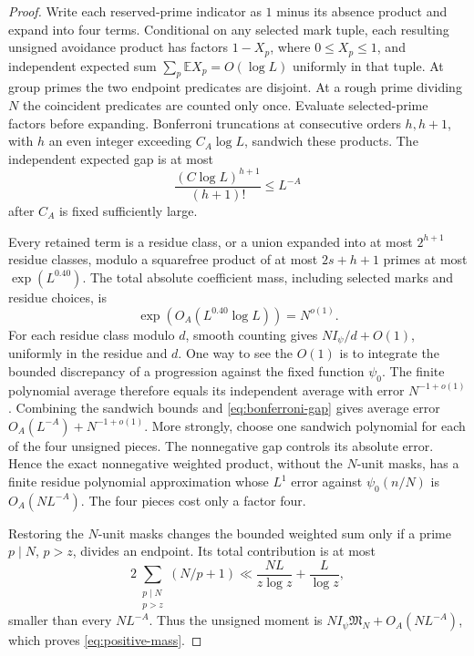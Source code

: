 \documentclass[11pt]{article}
\theoremstyle{definition}
\newcommand{\E}{\mathbb E}
\theoremstyle{remark}
\begin{document}
\begin{proof}
Write each reserved-prime indicator as $1$ minus its absence product
and expand into four terms. Conditional on any selected mark tuple,
each resulting unsigned avoidance product has factors $1-X_p$,
where $0\le X_p\le1$, and independent expected sum
$\sum_p\E X_p=O(\log L)$ uniformly in that tuple.
At group primes the two endpoint predicates are disjoint.
At a rough prime dividing $N$ the coincident predicates are counted
only once. Evaluate selected-prime factors before expanding.
Bonferroni truncations at consecutive orders $h,h+1$, with $h$ an
even integer exceeding $C_A\log L$, sandwich these products.
The independent expected gap is at most
\begin{equation}\label{eq:bonferroni-gap}
\frac{(C\log L)^{h+1}}{(h+1)!}\le L^{-A}
\end{equation}
after $C_A$ is fixed sufficiently large.

Every retained term is a residue class, or a union expanded into at
most $2^{h+1}$ residue classes, modulo a squarefree product of at most
$2s+h+1$ primes at most $\exp(L^{0.40})$.
The total absolute coefficient mass, including selected marks and
residue choices, is
\begin{equation}\label{eq:residue-cost}
\exp(O_A(L^{0.40}\log L))=N^{o(1)}.
\end{equation}
For each residue class modulo $d$, smooth counting gives
$NI_\psi/d+O(1)$, uniformly in the residue and $d$.
One way to see the $O(1)$ is to integrate the bounded discrepancy
of a progression against the fixed function $\psi_0$.
The finite polynomial average therefore equals its independent
average with error $N^{-1+o(1)}$.
Combining the sandwich bounds and \eqref{eq:bonferroni-gap}
gives average error $O_A(L^{-A})+N^{-1+o(1)}$.
More strongly, choose one sandwich polynomial for each of the four
unsigned pieces. The nonnegative gap controls its absolute error.
Hence the exact nonnegative weighted product, without the $N$-unit
masks, has a finite residue polynomial approximation whose $L^1$
error against $\psi_0(n/N)$ is $O_A(NL^{-A})$.
The four pieces cost only a factor four.

Restoring the $N$-unit masks changes the bounded weighted sum only
if a prime $p\mid N$, $p>z$, divides an endpoint.
Its total contribution is at most
\begin{equation}\label{eq:unit-mask-error}
2\sum_{\substack{p\mid N\\p>z}}(N/p+1)
\ll \frac{NL}{z\log z}+\frac L{\log z},
\end{equation}
smaller than every $NL^{-A}$.
Thus the unsigned moment is
$NI_\psi\mathfrak M_N+O_A(NL^{-A})$,
which proves \eqref{eq:positive-mass}.


\end{proof}
\end{document}
